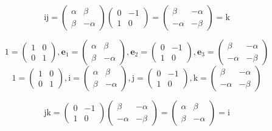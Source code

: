 \documentclass[
]{book}
\theoremstyle{definition}
\theoremstyle{definition}
\theoremstyle{definition}
\theoremstyle{definition}
\theoremstyle{remark}
\begin{document}
\[
\mathrm{i}\mathrm{j}=\begin{pmatrix}\alpha & \beta\\
\beta & -\alpha
\end{pmatrix}\begin{pmatrix}0 & -1\\
1 & 0
\end{pmatrix}=\begin{pmatrix}\beta & -\alpha\\
-\alpha & -\beta
\end{pmatrix}=\mathrm{k}
\]

\[
1=\begin{pmatrix}1 & 0\\
0 & 1
\end{pmatrix},\boldsymbol{e}_{{\scriptscriptstyle 1}}=\begin{pmatrix}\alpha & \beta\\
\beta & -\alpha
\end{pmatrix},\boldsymbol{e}_{{\scriptscriptstyle 2}}=\begin{pmatrix}0 & -1\\
1 & 0
\end{pmatrix},\boldsymbol{e}_{{\scriptscriptstyle 3}}=\begin{pmatrix}\beta & -\alpha\\
-\alpha & -\beta
\end{pmatrix}
\]
\[
1=\begin{pmatrix}1 & 0\\
0 & 1
\end{pmatrix},\mathrm{i}=\begin{pmatrix}\alpha & \beta\\
\beta & -\alpha
\end{pmatrix},\mathrm{j}=\begin{pmatrix}0 & -1\\
1 & 0
\end{pmatrix},\mathrm{k}=\begin{pmatrix}\beta & -\alpha\\
-\alpha & -\beta
\end{pmatrix}
\]

\[
\mathrm{j}\mathrm{k}=\begin{pmatrix}0 & -1\\
1 & 0
\end{pmatrix}\begin{pmatrix}\beta & -\alpha\\
-\alpha & -\beta
\end{pmatrix}=\begin{pmatrix}\alpha & \beta\\
\beta & -\alpha
\end{pmatrix}=\mathrm{i}
\]
\end{document}
